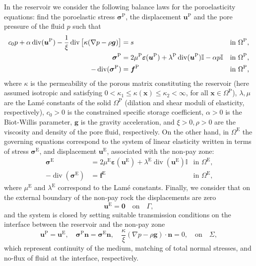 \documentclass[11pt]{article}
\numberwithin{equation}{section}
\newcommand{\vdiv}{\operatorname*{div}}
\def\b{\boldsymbol}
\newcommand\bx{\boldsymbol{x}}
\newcommand\ff{\boldsymbol{f}}
\renewcommand\gg{\boldsymbol{g}}
\newcommand\nn{\boldsymbol{n}}
\newcommand\cero{\boldsymbol{0}}
\newcommand\OmP{\Omega^{\mathrm{P}}}
\newcommand\OmE{\Omega^{\mathrm{E}}}
\numberwithin{equation}{section}
\begin{document}
	In the reservoir we consider the following balance laws for the
	poroelasticity equations:
	find the poroelastic stress $\b \sigma^{\mathrm{P}}$, the displacement $\b u^{\mathrm{P}}$ and the pore pressure of the fluid $p$ such that
	\begin{align}
	c_0p+\alpha\vdiv(\b u^{\mathrm{P}}) - \frac{1}{\xi}\vdiv \big{[}\kappa(\nabla p
	- \rho \boldsymbol{g})\big{]} &= s & \text{in $\OmP$,}   \label{poro1}\\
	\b \sigma^{\mathrm{P}}  &= 2\mu^{\mathrm{P}}\boldsymbol{\varepsilon}(\boldsymbol{\b u}^{\mathrm{P}})+\lambda^{\mathrm{P}}\vdiv(\b u^{\mathrm{P}})\mathbb{I}-\alpha p\mathbb{I}& \text{in $\OmP$,}  \label{vorm1}\\
	-\vdiv(\b \sigma^{\mathrm{P}}) & = \ff^{\mathrm{P}} & \text{in $\OmP$,} \label{poro3}
	\end{align}
	where $\kappa$ is the
	permeability of the porous matrix constituting the reservoir (here assumed isotropic and
	satisfying $0<\kappa_1\leq \kappa(\bx)\leq \kappa_2<\infty$, for all
	$\bx\in\OmP$), $\lambda,\mu$ are the Lam\'e constants of the solid $\OmP$ (dilation and shear 
	moduli of elasticity, respectively),
	$c_0>0$ is the constrained specific storage coefficient, $\alpha>0$ is
	the Biot-Willis parameter, $\gg$ is the gravity acceleration, 
	and $\xi>0,\rho>0$ are the viscosity and density of the pore fluid, respectively. On the other hand, in $\OmE$ the governing equations correspond to the system of linear elasticity 
	written in terms of stress $\b \sigma^{\mathrm{E}}$, and displacement $\b u^{\mathrm{E}}$,
	associated with the non-pay zone:
	\begin{align}
	\b \sigma^{\mathrm{E}}  &= 2\mu^{\mathrm{E}}\b \varepsilon(\b u^{\mathrm{E}})+\lambda^{\mathrm{E}}\vdiv(\b u^{\mathrm{E}})\mathbb{I}& \text{in $\OmE$,}  \label{elast1}\\
	-\vdiv(\b \sigma^{\mathrm{E}}) & = \ff^{\mathrm{E}} & \text{in $\OmE$,}\label{elast2}
	\end{align}
	where $\mu^{\mathrm{E}}$ and $\lambda^{\mathrm{E}}$ correspond to the Lam\'e constants. Finally, we consider that on the external boundary of the non-pay rock the displacements are zero 
	\begin{equation}\label{eq:bc}
	\b u^{\mathrm{E}}  =\cero \quad \text{on} \quad \Gamma,
	\end{equation}
	and  the system is closed by setting suitable transmission conditions on the interface between the 
	reservoir and the non-pay zone 
	\begin{equation}\label{eq:interface}
	\b u^{\mathrm{P}} = \b u^{\mathrm{E}}, \quad \b \sigma^{\mathrm{P}} \nn = \b \sigma^{\mathrm{E}}\nn , \quad 
	\frac{\kappa}{\xi} (\nabla p - \rho\gg)\cdot\nn = 0, 
	\quad \text{on}\quad \Sigma,
	\end{equation}
	which represent continuity of the medium, matching of total normal stresses, and no-flux of 
	fluid at the interface, respectively.
	
\end{document}
